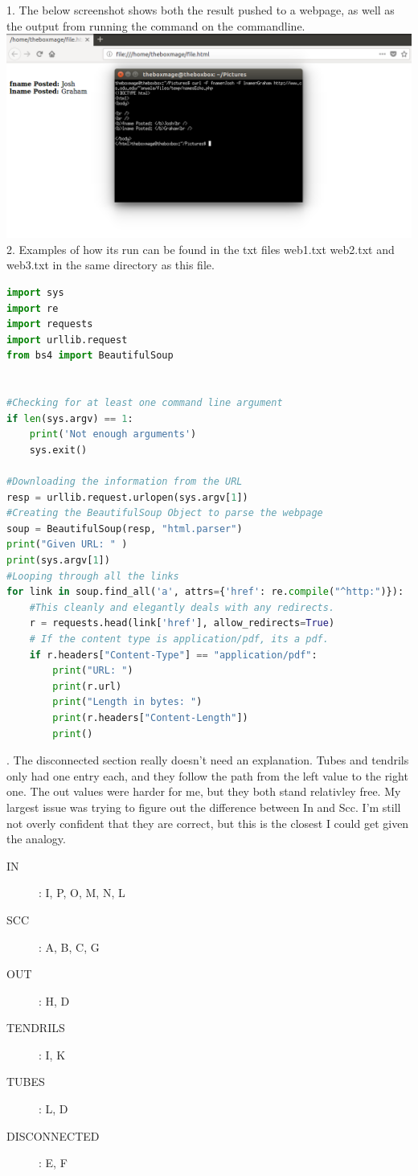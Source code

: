 \documentclass{article}
\begin{document}
	 1. The below screenshot shows both the result pushed to a webpage, as well as the output from running the command on the commandline.\\ 
	 	
	 \includegraphics[scale=0.30]{Curl.png}	
 	 \pagebreak
	 \\2. Examples of how its run can be found in the txt files web1.txt web2.txt and web3.txt in the same directory as this file.

	 \begin{lstlisting}[language=Python]
import sys
import re
import requests
import urllib.request
from bs4 import BeautifulSoup


#Checking for at least one command line argument
if len(sys.argv) == 1:
	print('Not enough arguments')
	sys.exit()

#Downloading the information from the URL
resp = urllib.request.urlopen(sys.argv[1])
#Creating the BeautifulSoup Object to parse the webpage
soup = BeautifulSoup(resp, "html.parser")
print("Given URL: " )
print(sys.argv[1])
#Looping through all the links
for link in soup.find_all('a', attrs={'href': re.compile("^http:")}):
	#This cleanly and elegantly deals with any redirects.
	r = requests.head(link['href'], allow_redirects=True)
	# If the content type is application/pdf, its a pdf.
	if r.headers["Content-Type"] == "application/pdf":
		print("URL: ")
		print(r.url)
		print("Length in bytes: ")
		print(r.headers["Content-Length"])
		print()
	\end{lstlisting}
	
	. The disconnected section really doesn't need an explanation. Tubes and tendrils only had one entry each, and they follow the path from the left value to the right one. The out values were harder for me, but they both stand relativley free. My largest issue was trying to figure out the difference between In and Scc. I'm still not overly confident that they are correct, but this is the closest I could get given the analogy.
	\begin{description}
	\item[IN]: I, P, O, M, N, L
	\item[SCC]: A, B, C, G
	\item[OUT]: H, D
	\item[TENDRILS]: I, K
	\item[TUBES]: L, D
	\item[DISCONNECTED]: E, F
	\end{description}
\end{document}
